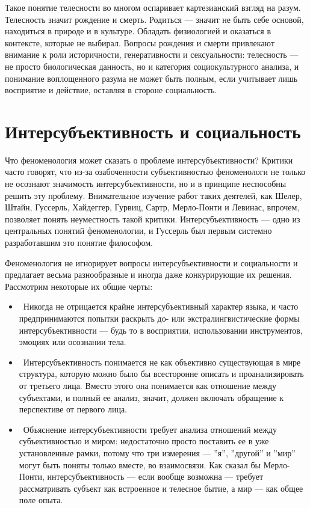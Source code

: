 \documentclass[11pt]{book}
\begin{document}
Такое понятие телесности во многом оспаривает картезианский взгляд на разум. Телесность значит рождение и смерть. Родиться --- значит не быть себе основой, находиться в природе и в культуре. Обладать физиологией и оказаться в контексте, которые не выбирал. Вопросы рождения и смерти привлекают внимание к роли историчности, генеративности и сексуальности: телесность --- не просто биологическая данность, но и категория социокультурного анализа, и понимание воплощенного разума не может быть полным, если учитывает лишь восприятие и действие, оставляя в стороне социальность.

\chapter{Интерсубъективность и социальность}

Что феноменология может сказать о проблеме интерсубъективности? Критики часто говорят, что из-за озабоченности субъективностью феноменологи не только не осознают значимость интерсубъективности, но и в принципе неспособны решить эту проблему. Внимательное изучение работ таких деятелей, как Шелер, Штайн, Гуссерль, Хайдеггер, Гурвиц, Сартр, Мерло-Понти и Левинас, впрочем, позволяет понять неуместность такой критики. Интерсубъективность --- одно из центральных понятий феноменологии, и Гуссерль был первым системно разработавшим это понятие философом.

Феноменология не игнорирует вопросы интерсубъективности и социальности и предлагает весьма разнообразные и иногда даже конкурирующие их решения. Рассмотрим некоторые их общие черты:

\begin{itemize}
  \item\ Никогда не отрицается крайне интерсубъективный характер языка, и часто предпринимаются попытки раскрыть до- или экстралингвистические формы интерсубъективности --- будь то в восприятии, использовании инструментов, эмоциях или осознании тела.
  \item\ Интерсубъективность понимается не как объективно существующая в мире структура, которую можно было бы всесторонне описать и проанализировать от третьего лица. Вместо этого она понимается как отношение между субъектами, и полный ее анализ, значит, должен включать обращение к перспективе от первого лица.
  \item\ Объяснение интерсубъективности требует анализа отношений между субъективностью и миром: недостаточно просто поставить ее в уже установленные рамки, потому что три измерения --- ''я'', ''другой'' и ''мир'' могут быть поняты только вместе, во взаимосвязи. Как сказал бы Мерло-Понти, интерсубъективность --- если вообще возможна --- требует рассматривать субъект как встроенное и телесное бытие, а мир --- как общее поле опыта.
\end{itemize}
\end{document}
